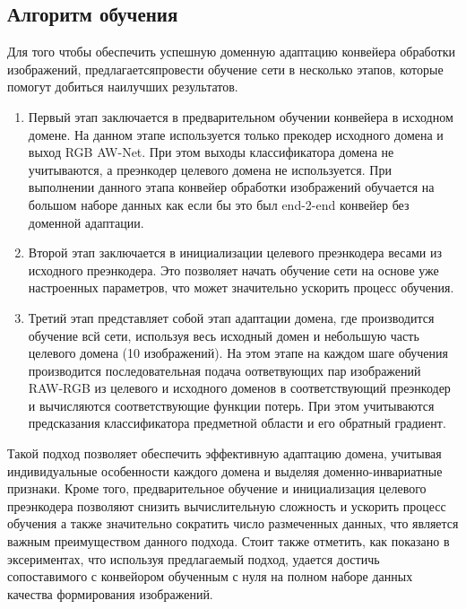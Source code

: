 \subsection{Алгоритм обучения}\label{sect-4-2}

Для того чтобы обеспечить успешную доменную адаптацию конвейера обработки изображений, предлагаетсяпровести обучение сети в несколько этапов, которые помогут добиться наилучших результатов.

\begin{enumerate}
    \item Первый этап заключается в предварительном обучении конвейера в исходном домене. На данном этапе используется только прекодер исходного домена и выход RGB AW-Net. При этом выходы классификатора домена не учитываются, а преэнкодер целевого домена не используется. При выполнении данного этапа конвейер обработки изображений обучается на большом наборе данных как если бы это был end-2-end конвейер без доменной адаптации.
    \item Второй этап заключается в инициализации целевого преэнкодера весами из исходного преэнкодера. Это позволяет начать обучение сети на основе уже настроенных параметров, что может значительно ускорить процесс обучения.
    \item Третий этап представляет собой этап адаптации домена, где производится обучение всй сети, используя весь исходный домен и небольшую часть целевого домена (10 изображений). На этом этапе на каждом шаге обучения производится последовательная подача оответвующих пар изображений RAW-RGB из целевого и исходного доменов в соответствующий преэнкодер и вычисляются соответствующие функции потерь. При этом учитываются предсказания классификатора предметной области и его обратный градиент.
\end{enumerate}

Такой подход позволяет обеспечить эффективную адаптацию домена, учитывая индивидуальные особенности каждого домена и выделяя доменно-инвариатные признаки. Кроме того, предварительное обучение и инициализация целевого преэнкодера позволяют снизить вычислительную сложность и ускорить процесс обучения а также значительно сократить число размеченных данных, что является важным преимуществом данного подхода. Стоит также отметить, как показано в эксериментах, что используя предлагаемый подход, удается достичь сопоставимого с конвейором обученным с нуля на полном наборе данных качества формирования изображений.


